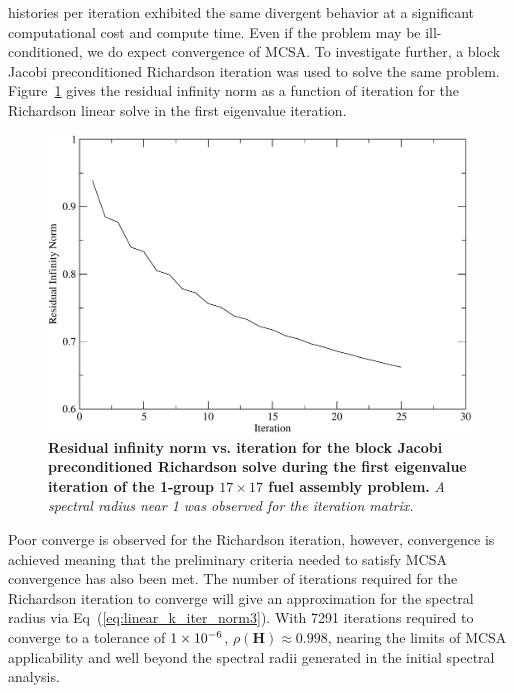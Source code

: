  histories per iteration exhibited the same divergent
behavior at a significant computational cost and compute time. Even if
the problem may be ill-conditioned, we do expect convergence of
MCSA. To investigate further, a block Jacobi preconditioned Richardson
iteration was used to solve the same
problem. Figure~\ref{fig:block_jacobi_res_richardson} gives the
residual infinity norm as a function of iteration for the Richardson
linear solve in the first eigenvalue iteration.
\begin{figure}[t!]
  \begin{center}
    \includegraphics[width=6in]{chapters/spn_equations/block_jacobi_rich_res.pdf}
  \end{center}
  \caption{\textbf{Residual infinity norm vs. iteration for the block
      Jacobi preconditioned Richardson solve during the first
      eigenvalue iteration of the 1-group $17 \times 17$ fuel assembly
      problem.} \textit{A spectral radius near 1 was observed for the
      iteration matrix.}}
  \label{fig:block_jacobi_res_richardson}
\end{figure}
Poor converge is observed for the Richardson iteration, however,
convergence is achieved meaning that the preliminary criteria needed
to satisfy MCSA convergence has also been met. The number of
iterations required for the Richardson iteration to converge will give
an approximation for the spectral radius via
Eq~(\ref{eq:linear_k_iter_norm3}). With 7291 iterations required to
converge to a tolerance of $1\times 10^{-6}$, $\rho(\mathbf{H}) \approx
0.998$, nearing the limits of MCSA applicability and well beyond the
spectral radii generated in the initial spectral analysis.

